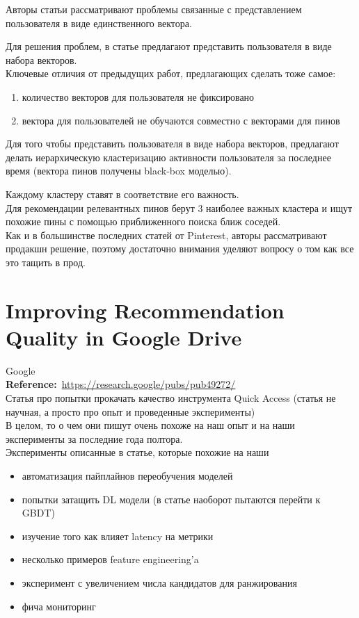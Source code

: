 \begin{bibunit}[plainnat]
Авторы статьи рассматривают проблемы связанные с представлением пользователя в виде единственного вектора.

Для решения проблем, в статье предлагают представить пользователя в виде набора векторов. \\

Ключевые отличия от предыдущих работ, предлагающих сделать тоже самое:
\begin{enumerate}
    \item количество векторов для пользователя не фиксировано
    \item вектора для пользователей не обучаются совместно с векторами для пинов
\end{enumerate}

Для того чтобы представить пользователя в виде набора векторов, предлагают делать иерархическую кластеризацию активности пользователя за последнее время (вектора пинов получены black-box моделью).

Каждому кластеру ставят в соответствие его важность.  \\

Для рекомендации релевантных пинов берут 3 наиболее важных кластера и ищут похожие пины с помощью приближенного поиска ближ соседей. \\

Как и в большинстве последних статей от Pinterest, авторы рассматривают продакшн решение, поэтому достаточно внимания уделяют вопросу о том как все это тащить в прод.

\section*{Improving Recommendation Quality in Google Drive}

Google \\

\textbf{Reference:}~\url{https://research.google/pubs/pub49272/} \\

Статья про попытки прокачать качество инструмента Quick Access (статья не научная, а просто про опыт и проведенные эксперименты) \\

В целом, то о чем они пишут очень похоже на наш опыт и на наши эксперименты за последние года полтора. \\

Эксперименты описанные в статье, которые похожие на наши
\begin{itemize}
    \item автоматизация пайплайнов переобучения моделей
    \item попытки затащить DL модели (в статье наоборот пытаются перейти к GBDT)
    \item изучение того как влияет latency на метрики
    \item несколько примеров feature engineering'a 
    \item эксперимент с увеличением числа кандидатов для ранжирования
    \item фича мониторинг
\end{itemize}

\end{bibunit}
